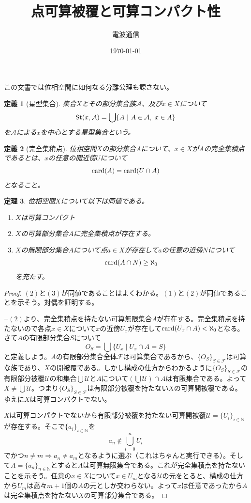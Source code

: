 \documentclass[leqno]{jsarticle}
\title{点可算被覆と可算コンパクト性}
\author{電波通信}
\date{\today}
\newtheorem{thm}{定理}
\newtheorem{df}[thm]{定義}
\newcommand{\To}{\Longrightarrow}
\newcommand{\nn}{\mathbb{N}}
\newcommand{\card}{\text{{\rm card}}}
\newcommand{\s}{\text{{\rm St}} }
\begin{document}
\maketitle
この文書では位相空間に如何なる分離公理も課さない。
\begin{df}[星型集合]
集合$X$とその部分集合族$\mathcal{A}$、及び$x\in X$について
\[
\s(x,\mathcal{A})=\bigcup\{A\ |\ A\in \mathcal{A},\ x\in A\}
\]
を$\mathcal{A}$による$x$を中心とする星型集合という。
\end{df}

\begin{df}[完全集積点]
位相空間$X$の部分集合$A$について、$x\in X$が$A$の完全集積点であるとは、$x$の任意の開近傍$U$について
\[
\card(A)=\card(U\cap A)
\]
となること。
\end{df}

\begin{thm}\label{aa}
位相空間$X$について以下は同値である。
\begin{enumerate}
\item $X$は可算コンパクト
\item $X$の可算部分集合$A$に完全集積点が存在する。
\item $X$の無限部分集合$A$について点$a\in X$が存在して$a$の任意の近傍$N$について
\[
\card(A\cap N)\ge \aleph_0
\]
を充たす。
\end{enumerate}
\end{thm}
\begin{proof}
$(2)$と$(3)$が同値であることはよくわかる。$(1)$と$(2)$が同値であることを示そう。対偶を証明する。\par
[$\lnot (2)\To \lnot(1)$の証明]\par
$\lnot(2)$より、完全集積点を持たない可算無限集合$A$が存在する。完全集積点を持たないので各点$x\in X$について$x$の近傍$U_x$が存在して$\card(U_x\cap A)<\aleph_0$となる。さて$A$の有限部分集合$S$について
\[
O_S=\bigcup\{U_x\mid U_x\cap A=S\}
\]
と定義しよう。$A$の有限部分集合全体$\mathcal{F}$は可算集合であるから、$\{O_S\}_{S\in \mathcal{F}}$は可算な族であり、$X$の開被覆である。しかし構成の仕方からわかるように$\{O_S\}_{S\in \mathcal{F}}$の有限部分被覆$\mathcal{U}$の和集合$\bigcup\mathcal{U}$と$A$について$(\bigcup\mathcal{U})\cap A$は有限集合である。よって$X\neq \bigcup\mathcal{U}$。つまり$\{O_S\}_{S\in \mathcal{F}}$は有限部分被覆を持たない$X$の可算開被覆である。ゆえに$X$は可算コンパクトでない。\par
[$\lnot (2)\To \lnot(1)$終わり]\par
[$\lnot (1)\To \lnot (2)$の証明]\par
$X$は可算コンパクトでないから有限部分被覆を持たない可算開被覆$\mathcal{U}=\{U_i\}_{i\in \nn}$が存在する。そこで$\{a_i\}_{i\in \nn}$を
\[
a_n\not\in \bigcup_{i=0}^nU_i
\]
でかつ$n\neq m\To a_n\neq a_m$となるように選ぶ（これはちゃんと実行できる）。そして$A=\{a_n\}_{n\in \nn}$とすると$A$は可算無限集合である。これが完全集積点を持たないことを示そう。任意の$x\in X$について$x\in U_m$となる$\mathcal{U}$の元をとると、構成の仕方から$U_m$は高々$m+1$個の$A$の元としか交わらない。よって$x$は任意であったから$A$は完全集積点を持たない$X$の可算部分集合である。\par
[$\lnot (1)\To \lnot (2)$終わり]
\end{proof}
\end{document}
